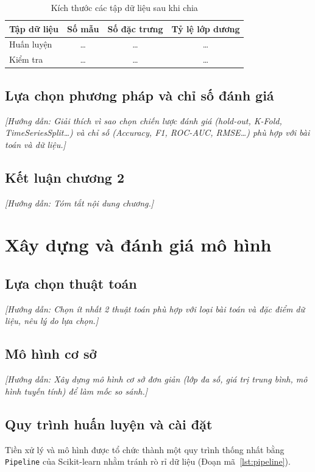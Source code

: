 \documentclass[12pt,a4paper,oneside]{report}
\newcommand{\huongdan}[1]{{\color{guide}\itshape [Hướng dẫn: #1]}}
\begin{document}
\begin{table}[H]
  \centering
  \caption{Kích thước các tập dữ liệu sau khi chia}
  \label{tab:kichthuoc}
  \begin{tabular}{lccc}
    \toprule
    \textbf{Tập dữ liệu} & \textbf{Số mẫu} & \textbf{Số đặc trưng} & \textbf{Tỷ lệ lớp dương} \\
    \midrule
    Huấn luyện & \dots & \dots & \dots \\
    Kiểm tra   & \dots & \dots & \dots \\
    \bottomrule
  \end{tabular}
\end{table}

\section{Lựa chọn phương pháp và chỉ số đánh giá}
\huongdan{Giải thích vì sao chọn chiến lược đánh giá (hold-out, K-Fold,
TimeSeriesSplit\dots) và chỉ số (Accuracy, F1, ROC-AUC, RMSE\dots) phù hợp
với bài toán và dữ liệu.}

\section{Kết luận chương 2}
\huongdan{Tóm tắt nội dung chương.}

\chapter{Xây dựng và đánh giá mô hình}
\label{chap:mohinh}

\section{Lựa chọn thuật toán}
\huongdan{Chọn ít nhất 2 thuật toán phù hợp với loại bài toán và đặc điểm
dữ liệu, nêu lý do lựa chọn.}

\section{Mô hình cơ sở}
\huongdan{Xây dựng mô hình cơ sở đơn giản (lớp đa số, giá trị trung bình,
mô hình tuyến tính) để làm mốc so sánh.}

\section{Quy trình huấn luyện và cài đặt}
Tiền xử lý và mô hình được tổ chức thành một quy trình thống nhất bằng
\texttt{Pipeline} của Scikit-learn \cite{pedregosa2011} nhằm tránh rò rỉ dữ
liệu (Đoạn mã~\ref{lst:pipeline}).
\end{document}
